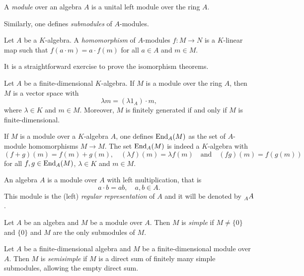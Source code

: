 \begin{definition}
    A \emph{module} over an algebra $A$ is a unital left module 
    over the ring $A$.
\end{definition}

Similarly, one defines \emph{submodules} of $A$-modules. 

\begin{definition}
Let $A$ be a $K$-algebra. 
A \emph{homomorphism} of $A$-modules 
$f\colon M\to N$ is a $K$-linear map such that $f(a\cdot m)=a\cdot f(m)$ for all
$a\in A$ and $m\in M$.  
\end{definition}

It is a straightforward exercise to 
prove the isomorphism theorems. 

Let $A$ be a finite-dimensional $K$-algebra. 
If $M$ is a module over the ring $A$, then $M$ is a vector space with  
\[
\lambda m=(\lambda 1_A)\cdot m, 
\]
where $\lambda\in K$ and $m\in M$. 
Moreover, $M$ is finitely generated if and only if $M$ is finite-dimensional.  

\begin{example}
If $M$ is a module over a $K$-algebra $A$, one defines $\operatorname{End}_A(M)$ as the set
of $A$-module homomorphisms $M\to M$. The set  
$\operatorname{End}_A(M)$ is indeed a $K$-algebra with 
\[
(f+g)(m)=f(m)+g(m),\quad 
(\lambda f)(m)=\lambda f(m)
\quad\text{and}
\quad 
(fg)(m)=f(g(m))
\]
for all $f,g\in\operatorname{End}_A(M)$, 
$\lambda\in K$ and $m\in M$. 
\end{example}


\begin{example}
An algebra  $A$ is a module over $A$ with left multiplication, that is 
\[
a\cdot b=ab,\quad a,b\in A.
\]
This module is the (left) \emph{regular representation} of $A$ and it will be denoted by $\prescript{}{A}{A}$. 
\end{example}

\begin{definition}
	Let $A$ be an algebra and $M$ be a module over $A$. Then 
	$M$ is \emph{simple} if $M\ne\{0\}$ and $\{0\}$ and $M$ 
	are the only submodules of $M$.	
\end{definition}

\begin{definition}
	Let $A$ be a finite-dimensional 
	algebra and $M$ be a finite-dimensional module over $A$. Then 
	$M$ is \emph{semisimple} if $M$ is a direct sum of 
	finitely many simple submodules, allowing the empty direct sum.  
\end{definition}

